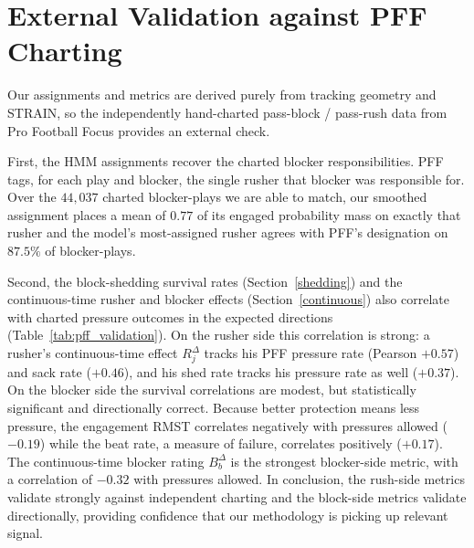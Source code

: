 \documentclass[USenglish]{article}
\theoremstyle{dgthm}
\theoremstyle{dgdef}
\begin{document}
\section{External Validation against PFF Charting} \label{pffvalid}
Our assignments and metrics are derived purely from tracking geometry and STRAIN, so the independently hand-charted pass-block / pass-rush data from Pro Football Focus provides an external check.

First, the HMM assignments recover the charted blocker responsibilities. PFF tags, for each play and blocker, the single rusher that blocker was responsible for. Over the $44{,}037$ charted blocker-plays we are able to match, our smoothed assignment places a mean of $0.77$ of its engaged probability mass on exactly that rusher and the model's most-assigned rusher agrees with PFF's designation on $87.5\%$ of blocker-plays. 

Second, the block-shedding survival rates (Section~\ref{shedding}) and the continuous-time rusher and blocker effects (Section~\ref{continuous}) also correlate with charted pressure outcomes in the expected directions (Table~\ref{tab:pff_validation}). On the rusher side this correlation is strong: a rusher's continuous-time effect $R^{\Delta}_j$ tracks his PFF pressure rate (Pearson $+0.57$) and sack rate ($+0.46$), and his shed rate tracks his pressure rate as well ($+0.37$). On the blocker side the survival correlations are modest, but statistically significant and directionally correct. Because better protection means less pressure, the engagement RMST correlates negatively with pressures allowed ($-0.19$) while the beat rate, a measure of failure, correlates positively ($+0.17$). The continuous-time blocker rating $B^{\Delta}_b$ is the strongest blocker-side metric, with a correlation of $-0.32$ with pressures allowed. In conclusion, the rush-side metrics validate strongly against independent charting and the block-side metrics validate directionally, providing confidence that our methodology is picking up relevant signal.






\clearpage
\end{document}
